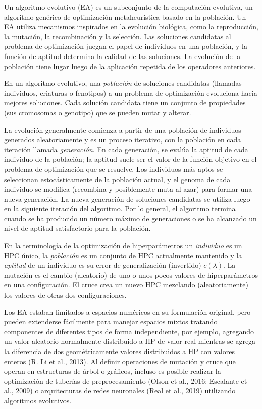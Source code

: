 Un algoritmo evolutivo (EA) es un subconjunto de la computación evolutiva, un algoritmo genérico de optimización metaheurística basado en la población. Un EA utiliza mecanismos inspirados en la evolución biológica, como la reproducción, la mutación, la recombinación y la selección. Las soluciones candidatas al problema de optimización juegan el papel de individuos en una población, y la función de aptitud determina la calidad de las soluciones. La evolución de la población tiene lugar luego de la aplicación repetida de los operadores anteriores.

En un algoritmo evolutivo, una \textit{población} de soluciones candidatas (llamadas individuos, criaturas o fenotipos) a un problema de optimización evoluciona hacia mejores soluciones. Cada solución candidata tiene un conjunto de propiedades (sus cromosomas o genotipo) que se pueden mutar y alterar.

La evolución generalmente comienza a partir de una población de individuos generados aleatoriamente y es un proceso iterativo, con la población en cada iteración llamada \textit{generación}. En cada generación, se evalúa la aptitud de cada individuo de la población; la aptitud suele ser el valor de la función objetivo en el problema de optimización que se resuelve. Los individuos más aptos se seleccionan estocásticamente de la población actual, y el genoma de cada individuo se modifica (recombina y posiblemente muta al azar) para formar una nueva generación. La nueva generación de soluciones candidatas se utiliza luego en la siguiente iteración del algoritmo. Por lo general, el algoritmo termina cuando se ha producido un número máximo de generaciones o se ha alcanzado un nivel de aptitud satisfactorio para la población.

En la terminología de la optimización de hiperparámetros un \textit{individuo} es un HPC único, la \textit{población} es un conjunto de HPC actualmente mantenido y la \textit{aptitud} de un individuo es su error de generalización (invertido) $c(\lambda)$. La mutación es el cambio (aleatorio) de uno o unos pocos valores de hiperparámetros en una configuración. El cruce crea un nuevo HPC mezclando (aleatoriamente) los valores de otras dos configuraciones.

Los EA estaban limitados a espacios numéricos en su formulación original, pero pueden extenderse fácilmente para manejar espacios mixtos tratando componentes de diferentes tipos de forma independiente, por ejemplo, agregando un valor aleatorio normalmente distribuido a HP de valor real mientras se agrega la diferencia de dos geométricamente valores distribuidos a HP con valores enteros (R. Li et al., 2013). Al definir operaciones de mutación y cruce que operan en estructuras de árbol o gráficos, incluso es posible realizar la optimización de tuberías de preprocesamiento (Olson et al., 2016; Escalante et al., 2009) o arquitecturas de redes neuronales (Real et al., 2019) utilizando algoritmos evolutivos.

